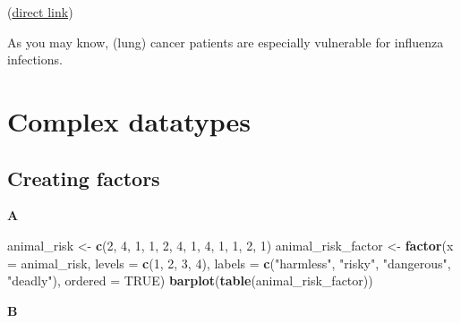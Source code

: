 \documentclass[]{book}
\newenvironment{Shaded}{\begin{snugshade}}{\end{snugshade}}
\newcommand{\DataTypeTok}[1]{\textcolor[rgb]{0.13,0.29,0.53}{#1}}
\newcommand{\DecValTok}[1]{\textcolor[rgb]{0.00,0.00,0.81}{#1}}
\newcommand{\KeywordTok}[1]{\textcolor[rgb]{0.13,0.29,0.53}{\textbf{#1}}}
\newcommand{\NormalTok}[1]{#1}
\newcommand{\OtherTok}[1]{\textcolor[rgb]{0.56,0.35,0.01}{#1}}
\newcommand{\StringTok}[1]{\textcolor[rgb]{0.31,0.60,0.02}{#1}}
\begin{document}
(\href{https://stacks.cdc.gov/view/cdc/287/cdc_287_DS1.pdf}{direct link})

As you may know, (lung) cancer patients are especially vulnerable for influenza infections.

\hypertarget{complex-datatypes-1}{%
\section{Complex datatypes}\label{complex-datatypes-1}}

\hypertarget{creating-factors-1}{%
\subsection{Creating factors}\label{creating-factors-1}}

\textbf{A}

\begin{Shaded}
\begin{Highlighting}[]
\NormalTok{animal_risk <-}\StringTok{ }\KeywordTok{c}\NormalTok{(}\DecValTok{2}\NormalTok{, }\DecValTok{4}\NormalTok{, }\DecValTok{1}\NormalTok{, }\DecValTok{1}\NormalTok{, }\DecValTok{2}\NormalTok{, }\DecValTok{4}\NormalTok{, }\DecValTok{1}\NormalTok{, }\DecValTok{4}\NormalTok{, }\DecValTok{1}\NormalTok{, }\DecValTok{1}\NormalTok{, }\DecValTok{2}\NormalTok{, }\DecValTok{1}\NormalTok{)}
\NormalTok{animal_risk_factor <-}\StringTok{ }\KeywordTok{factor}\NormalTok{(}\DataTypeTok{x =}\NormalTok{ animal_risk,}
                             \DataTypeTok{levels =} \KeywordTok{c}\NormalTok{(}\DecValTok{1}\NormalTok{, }\DecValTok{2}\NormalTok{, }\DecValTok{3}\NormalTok{, }\DecValTok{4}\NormalTok{),}
                             \DataTypeTok{labels =} \KeywordTok{c}\NormalTok{(}\StringTok{"harmless"}\NormalTok{, }\StringTok{"risky"}\NormalTok{, }\StringTok{"dangerous"}\NormalTok{, }\StringTok{"deadly"}\NormalTok{),}
                             \DataTypeTok{ordered =} \OtherTok{TRUE}\NormalTok{)}
\KeywordTok{barplot}\NormalTok{(}\KeywordTok{table}\NormalTok{(animal_risk_factor))}
\end{Highlighting}
\end{Shaded}

\textbf{B}
\end{document}
